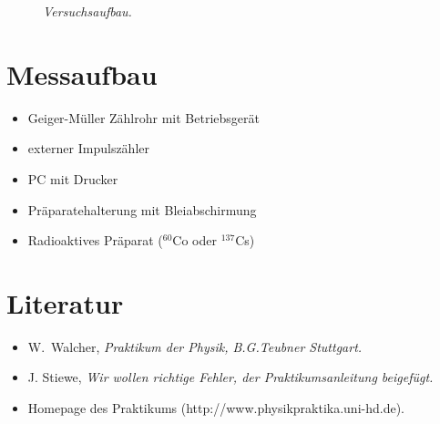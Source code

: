 \documentclass{../papanleitung}
\begin{document}
\begin{figure}[h]
\begin{minipage}[c]{12cm}
\centering{}
\caption{\fontsize{10}{12}\it Versuchsaufbau.}
\end{minipage}
\end{figure}


\section{Messaufbau}
\begin{itemize}
 \item  Geiger-M\"{u}ller Z\"{a}hlrohr mit Betriebsger\"{a}t
 \item  externer Impulsz\"{a}hler
 \item PC mit Drucker
 \item Pr\"{a}paratehalterung mit Bleiabschirmung
 \item Radioaktives Pr\"{a}parat ($^{60}$Co oder $^{137}$Cs)
\end{itemize}

\section{Literatur}

\begin{itemize}
 \item W.~Walcher,  \it{Praktikum der Physik}\rm, B.G.Teubner
 Stuttgart.
\item J. Stiewe, \it Wir wollen richtige Fehler\rm, der
Praktikumsanleitung beigef\"{u}gt.
 \item  Homepage des Praktikums
(http://www.physikpraktika.uni-hd.de).
\end{itemize}
\end{document}

